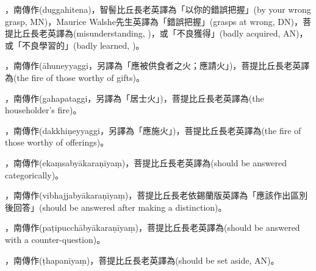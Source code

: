 \startitemgroup[noteitems]
\item{}，南傳作(duggahitena)，智髻比丘長老英譯為「以你的錯誤把握」(by your wrong grasp, MN)，Maurice Walshe先生英譯為「錯誤把握」(grasps at wrong, DN)，菩提比丘長老英譯為(misunderstanding, )，或「不良獲得」(badly acquired, AN)，或「不良學習的」(badly learned, )。
\stopitemgroup

\startitemgroup[noteitems]
\item{}，南傳作(āhuneyyaggi，另譯為「應被供食者之火；應請火」)，菩提比丘長老英譯為(the fire of those worthy of gifts)。
\item{}，南傳作(gahapataggi，另譯為「居士火」)，菩提比丘長老英譯為(the householder's fire)。
\item{}，南傳作(dakkhiṇeyyaggi，另譯為「應施火」)，菩提比丘長老英譯為(the fire of those worthy of offerings)。
\stopitemgroup

\startitemgroup[noteitems]
\item{}，南傳作(ekaṃsabyākaraṇīyaṃ)，菩提比丘長老英譯為(should be answered categorically)。
\item{}，南傳作(vibhajjabyākaraṇīyaṃ)，菩提比丘長老依錫蘭版英譯為「應該作出區別後回答」(should be answered after making a distinction)。
\item{}，南傳作(paṭipucchābyākaraṇīyaṃ)，菩提比丘長老英譯為(should be answered with a counter-question)。
\item{}，南傳作(ṭhapanīyaṃ)，菩提比丘長老英譯為(should be set aside, AN)。
\stopitemgroup


